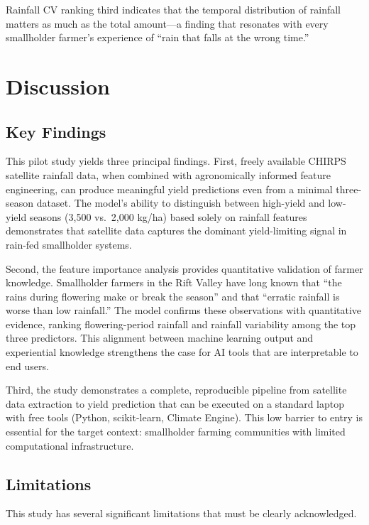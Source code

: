\documentclass[11pt,a4paper]{article}
\begin{document}
Rainfall CV ranking third indicates that the temporal distribution of rainfall matters as much as the total amount---a finding that resonates with every smallholder farmer's experience of ``rain that falls at the wrong time.''

\section{Discussion}

\subsection{Key Findings}

This pilot study yields three principal findings. First, freely available CHIRPS satellite rainfall data, when combined with agronomically informed feature engineering, can produce meaningful yield predictions even from a minimal three-season dataset. The model's ability to distinguish between high-yield and low-yield seasons (3,500 vs.\ 2,000 kg/ha) based solely on rainfall features demonstrates that satellite data captures the dominant yield-limiting signal in rain-fed smallholder systems.

Second, the feature importance analysis provides quantitative validation of farmer knowledge. Smallholder farmers in the Rift Valley have long known that ``the rains during flowering make or break the season'' and that ``erratic rainfall is worse than low rainfall.'' The model confirms these observations with quantitative evidence, ranking flowering-period rainfall and rainfall variability among the top three predictors. This alignment between machine learning output and experiential knowledge strengthens the case for AI tools that are interpretable to end users.

Third, the study demonstrates a complete, reproducible pipeline from satellite data extraction to yield prediction that can be executed on a standard laptop with free tools (Python, scikit-learn, Climate Engine). This low barrier to entry is essential for the target context: smallholder farming communities with limited computational infrastructure.

\subsection{Limitations}

This study has several significant limitations that must be clearly acknowledged.
\end{document}
